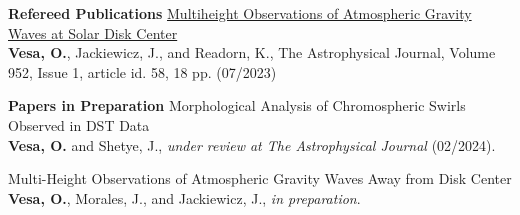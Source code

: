 \documentclass{resume} %
\begin{document}

\vspace{-0.1in}
\begin{rSection}{\textbf{Refereed Publications}}
\vspace{0.02in}
\href{https://iopscience.iop.org/article/10.3847/1538-4357/acd930}{Multiheight Observations of Atmospheric Gravity Waves at Solar Disk Center} \\ {\bf Vesa, O.}, Jackiewicz, J., and Readorn, K., The Astrophysical Journal, Volume 952, Issue 1, article id. 58, 18 pp. (07/2023)
\end{rSection} 


\vspace{-0.1in}
\begin{rSection}{\textbf{Papers in Preparation}}
\vspace{0.02in}
Morphological Analysis of Chromospheric Swirls Observed in DST Data \\
{\bf Vesa, O.} and Shetye, J., {\it under review at The Astrophysical Journal} (02/2024).

Multi-Height Observations of Atmospheric Gravity Waves Away from Disk Center \\
{\bf Vesa, O.}, Morales, J., and Jackiewicz, J., {\it in preparation}.
\end{rSection} 
\end{document}
